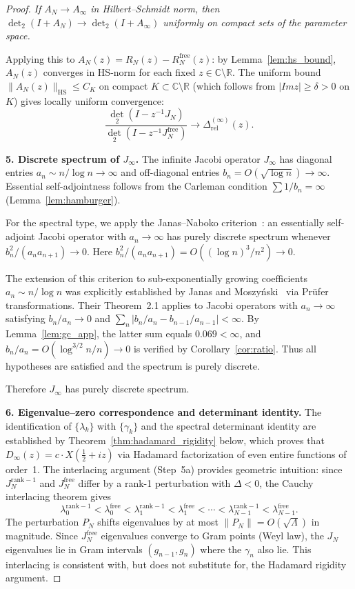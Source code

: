 \documentclass{pre-aomart}
\def\Im{Im}%
\def\xi{X}%
\theoremstyle{plain}
\theoremstyle{definition}
\theoremstyle{remark}
\begin{document}
\begin{proof}
\emph{If $A_N \to A_\infty$ in Hilbert--Schmidt norm, then
$\det_2(I + A_N) \to \det_2(I + A_\infty)$ uniformly on compact
sets of the parameter space.}

Applying this to $A_N(z) = R_N(z) - R_N^{\mathrm{free}}(z)$: by
Lemma~\ref{lem:hs_bound}, $A_N(z)$ converges in HS-norm for each
fixed $z \in \mathbb{C}\setminus\mathbb{R}$.  The uniform bound
$\|A_N(z)\|_{\mathrm{HS}} \le C_K$ on compact $K \subset \mathbb{C}\setminus\mathbb{R}$
(which follows from $|\Im z| \ge \delta > 0$ on $K$) gives locally
uniform convergence:
\[
\frac{\det_2(I - z^{-1}J_N)}{\det_2(I - z^{-1}J_N^{\mathrm{free}})}
\to \Delta_{\text{rel}}^{(\infty)}(z).
\]

\textbf{5. Discrete spectrum of $J_\infty$.}
The infinite Jacobi operator $J_\infty$ has diagonal entries
$a_n \sim n/\log n \to \infty$ and off-diagonal entries
$b_n = O(\sqrt{\log n}) \to \infty$.  Essential self-adjointness
follows from the Carleman condition $\sum 1/b_n = \infty$
(Lemma~\ref{lem:hamburger}).

For the spectral type, we apply the Janas--Naboko
criterion~\cite{JanasNaboko2001}: an essentially self-adjoint Jacobi
operator with $a_n \to \infty$ has purely discrete spectrum whenever
$b_n^2/(a_n a_{n+1}) \to 0$.  Here
$b_n^2/(a_n a_{n+1}) = O((\log n)^3/n^2) \to 0$.

The extension of this criterion to sub-exponentially growing coefficients
$a_n \sim n/\log n$ was explicitly established by
Janas and Moszy\'nski~\cite{JanasMoszynski2003} via Pr\"ufer transformations.
Their Theorem~2.1 applies to Jacobi operators with $a_n \to \infty$
satisfying $b_n/a_n \to 0$ and
$\sum_{n} |b_n/a_n - b_{n-1}/a_{n-1}| < \infty$.
By Lemma~\ref{lem:gc_app}, the latter sum equals $0.069 < \infty$,
and $b_n/a_n = O(\log^{3/2} n / n) \to 0$ is verified by
Corollary~\ref{cor:ratio}.  Thus all hypotheses are satisfied and the
spectrum is purely discrete.

Therefore $J_\infty$ has purely discrete spectrum.

\textbf{6. Eigenvalue--zero correspondence and determinant identity.}
The identification of $\{\lambda_k\}$ with $\{\gamma_k\}$ and the
spectral determinant identity are established by
Theorem~\ref{thm:hadamard_rigidity} below, which proves that
$D_\infty(z) = c \cdot \xi(\tfrac12+iz)$ via Hadamard factorization
of even entire functions of order~1.  The interlacing argument
(Step~5a) provides geometric intuition: since $J_N^{\mathrm{rank-1}}$
and $J_N^{\mathrm{free}}$ differ by a rank-1 perturbation with
$\Delta < 0$, the Cauchy interlacing theorem gives
\[
\lambda_0^{\mathrm{rank-1}} < \lambda_0^{\mathrm{free}} < \lambda_1^{\mathrm{rank-1}}
  < \lambda_1^{\mathrm{free}} < \cdots < \lambda_{N-1}^{\mathrm{rank-1}}
  < \lambda_{N-1}^{\mathrm{free}}.
\]
The perturbation $P_N$ shifts eigenvalues by at most
$\|P_N\| = O(\sqrt{\Lambda})$ in magnitude.  Since $J_N^{\mathrm{free}}$ eigenvalues
converge to Gram points (Weyl law), the $J_N$ eigenvalues lie in
Gram intervals $(g_{n-1}, g_n)$ where the $\gamma_n$ also lie.
This interlacing is consistent with, but does not substitute for,
the Hadamard rigidity argument.


\end{proof}
\end{document}
